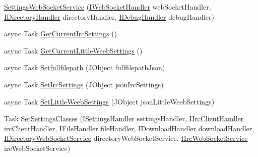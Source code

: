 \begin{DoxyCompactItemize}
\item 
\mbox{\hyperlink{class_little_weeb_library_1_1_services_1_1_settings_web_socket_service_aaaa502b8a0362b6852d909887727bddb}{Settings\+Web\+Socket\+Service}} (\mbox{\hyperlink{interface_little_weeb_library_1_1_handlers_1_1_i_web_socket_handler}{I\+Web\+Socket\+Handler}} web\+Socket\+Handler, \mbox{\hyperlink{interface_little_weeb_library_1_1_handlers_1_1_i_directory_handler}{I\+Directory\+Handler}} directory\+Handler, \mbox{\hyperlink{interface_little_weeb_library_1_1_handlers_1_1_i_debug_handler}{I\+Debug\+Handler}} debug\+Handler)
\item 
async Task \mbox{\hyperlink{class_little_weeb_library_1_1_services_1_1_settings_web_socket_service_aaa29fbcae1268174d436730a58afadca}{Get\+Current\+Irc\+Settings}} ()
\item 
async Task \mbox{\hyperlink{class_little_weeb_library_1_1_services_1_1_settings_web_socket_service_a50cbfe4ba270c9e84b6b7b427a1b9ce0}{Get\+Current\+Little\+Weeb\+Settings}} ()
\item 
async Task \mbox{\hyperlink{class_little_weeb_library_1_1_services_1_1_settings_web_socket_service_aef49a5d18d17b206d2807bba6c28f793}{Setfullfilepath}} (J\+Object fullfilepath\+Json)
\item 
async Task \mbox{\hyperlink{class_little_weeb_library_1_1_services_1_1_settings_web_socket_service_a898cb4543b5abd273844405770687442}{Set\+Irc\+Settings}} (J\+Object json\+Irc\+Settings)
\item 
async Task \mbox{\hyperlink{class_little_weeb_library_1_1_services_1_1_settings_web_socket_service_aa53e9a1723c0b2d607d2aa9db1991c3c}{Set\+Little\+Weeb\+Settings}} (J\+Object json\+Little\+Weeb\+Settings)
\item 
Task \mbox{\hyperlink{class_little_weeb_library_1_1_services_1_1_settings_web_socket_service_af799e00c29f6eec4ca8874cda559c225}{Set\+Settings\+Classes}} (\mbox{\hyperlink{interface_little_weeb_library_1_1_handlers_1_1_i_settings_handler}{I\+Settings\+Handler}} settings\+Handler, \mbox{\hyperlink{interface_little_weeb_library_1_1_handlers_1_1_i_irc_client_handler}{I\+Irc\+Client\+Handler}} irc\+Client\+Handler, \mbox{\hyperlink{interface_little_weeb_library_1_1_handlers_1_1_i_file_handler}{I\+File\+Handler}} file\+Handler, \mbox{\hyperlink{interface_little_weeb_library_1_1_handlers_1_1_i_download_handler}{I\+Download\+Handler}} download\+Handler, \mbox{\hyperlink{interface_little_weeb_library_1_1_services_1_1_i_directory_web_socket_service}{I\+Directory\+Web\+Socket\+Service}} directory\+Web\+Socket\+Service, \mbox{\hyperlink{interface_little_weeb_library_1_1_services_1_1_i_irc_web_socket_service}{I\+Irc\+Web\+Socket\+Service}} irc\+Web\+Socket\+Service)
\end{DoxyCompactItemize}
